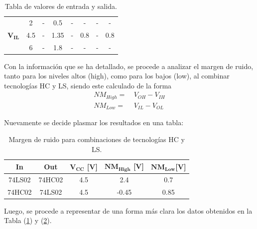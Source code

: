 \begin{table}[H]
\begin{tabular}{c|c|c|c|c|c|c|c|}
\multicolumn{1}{|c|}{}         & 2            & -             & 0.5          & -             & -            & -            & -            \\ 
\multicolumn{1}{|c|}{$\mathbf{V_{IL}}$} & 4.5          & -             & 1.35         & -             & 0.8          & -            & 0.8          \\ 
\multicolumn{1}{|c|}{}         & 6            & -             & 1.8          & -             & -            & -            & -            \\ \hline
\end{tabular}
\centering
\caption{Tabla de valores de entrada y salida.}
\label{tabla:vinout}
\end{table}

Con la información que se ha detallado, se procede a analizar el margen de ruido, tanto para los niveles altos (high), como para los bajos (low), al combinar tecnologías HC y LS, siendo este calculado de la forma
\begin{equation*}
\begin{aligned}
		NM_{High}=\ & V_{OH} - V_{IH} \\
		NM_{Low}=\ & V_{IL} - V_{OL} 
\end{aligned}
\end{equation*}

Nuevamente se decide plasmar los resultados en una tabla:
\begin{table}[H]
\centering
\begin{tabular}{ccccc}
\hline
\textbf{In} & \textbf{Out} & $\mathbf{V_{CC}}$ \textbf{[V]} & $\mathbf{NM_{High}}$ \textbf{[V]} & $\mathbf{NM_{Low}} $\textbf{[V]} \\ \hline
74LS02      & 74HC02       & 4.5                            & 2.4                               & 0.7                              \\ 
74HC02      & 74LS02       & 4.5                              & -0.45                               & 0.85                                \\ \hline
\end{tabular}
\caption{Margen de ruido para combinaciones de tecnologías HC y LS.}
\label{tabla:nm}
\end{table}

Luego, se procede a representar de una forma más clara los datos obtenidos en la Tabla (\ref{tabla:vinout}) y (\ref{tabla:nm}).  

